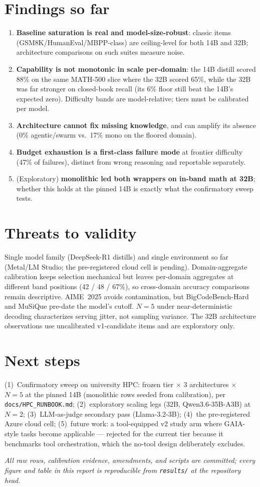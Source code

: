 \documentclass[sigconf,nonacm]{acmart}
\begin{document}
\section{Findings so far}
\begin{enumerate}
\item \textbf{Baseline saturation is real and model-size-robust}: classic items
(GSM8K/HumanEval/MBPP-class) are ceiling-level for both 14B and 32B; architecture
comparisons on such suites measure noise.
\item \textbf{Capability is not monotonic in scale per-domain}: the 14B distill scored
88\% on the same MATH-500 slice where the 32B scored 65\%, while the 32B was far
stronger on closed-book recall (its 6\% floor still beat the 14B's expected zero).
Difficulty bands are model-relative; tiers must be calibrated per model.
\item \textbf{Architecture cannot fix missing knowledge}, and can amplify its absence
(0\% agentic/swarm vs.\ 17\% mono on the floored domain).
\item \textbf{Budget exhaustion is a first-class failure mode} at frontier difficulty
(47\% of failures), distinct from wrong reasoning and reportable separately.
\item (Exploratory) \textbf{monolithic led both wrappers on in-band math at 32B};
whether this holds at the pinned 14B is exactly what the confirmatory sweep tests.
\end{enumerate}

\section{Threats to validity}
Single model family (DeepSeek-R1 distills) and single environment so far (Metal/LM
Studio; the pre-registered cloud cell is pending). Domain-aggregate calibration keeps
selection mechanical but leaves per-domain aggregates at different band positions (42
/ 48 / 67\%), so cross-domain accuracy comparisons remain descriptive. AIME~2025
avoids contamination, but BigCodeBench-Hard and MuSiQue pre-date the model's cutoff.
$N{=}5$ under near-deterministic decoding characterizes serving jitter, not sampling
variance. The 32B architecture observations use uncalibrated v1-candidate items and
are exploratory only.

\section{Next steps}
(1)~Confirmatory sweep on university HPC: frozen tier $\times$ 3 architectures
$\times$ $N{=}5$ at the pinned 14B (monolithic rows seeded from calibration), per
\texttt{docs/HPC\_RUNBOOK.md}; (2)~exploratory scaling legs (32B, Qwen3.6-35B-A3B) at
$N{=}2$; (3)~LLM-as-judge secondary pass (Llama-3.2-3B); (4)~the pre-registered Azure
cloud cell; (5)~future work: a tool-equipped v2 study arm where GAIA-style tasks
become applicable --- rejected for the current tier because it benchmarks tool
orchestration, which the no-tool design deliberately excludes.

\vspace{1em}
\noindent\textit{All raw rows, calibration evidence, amendments, and scripts are
committed; every figure and table in this report is reproducible from
\texttt{results/} at the repository head.}
\end{document}
